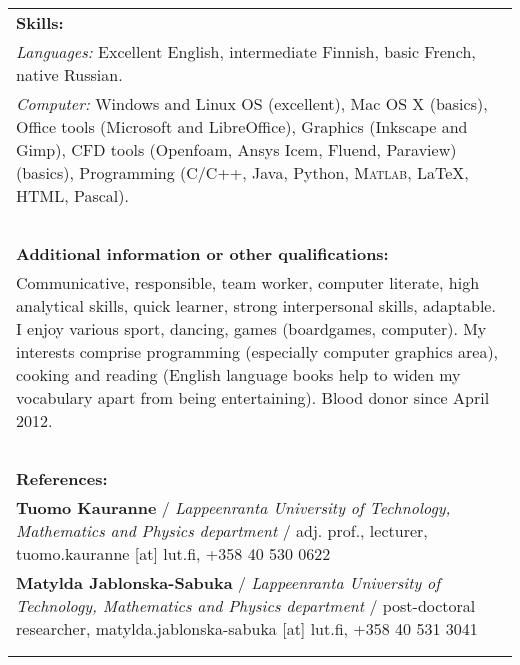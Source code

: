 \documentclass[a4paper]{article}
\begin{document}
\begin{longtable}{p{}}

\multicolumn{1}{l}{\cellcolor{myGray}\textbf{Skills:}}\\\vspace{-5pt}

\emph{Languages:} Excellent English, intermediate Finnish, basic French,
native Russian.\\

\emph{Computer:} Windows and Linux OS (excellent), Mac OS X (basics), Office
tools (Microsoft and LibreOffice), Graphics (Inkscape and Gimp), CFD tools
(Openfoam, Ansys Icem, Fluend, Paraview) (basics), Programming (C/C++, Java,
Python, \textsc{Matlab}, \LaTeX, HTML, Pascal).\\\ \\

\multicolumn{1}{l}{\cellcolor{myGray}\textbf{Additional information or other
qualifications:}}\\\vspace{-5pt}

Communicative, responsible, team worker, computer literate, high analytical
skills, quick learner, strong interpersonal skills, adaptable. I enjoy various
sport, dancing, games (boardgames, computer). My interests comprise programming
(especially computer graphics area), cooking and reading (English language
books help to widen my vocabulary apart from being entertaining). Blood donor
since April 2012.\\\ \\

\multicolumn{1}{l}{\cellcolor{myGray}\textbf{References:}}\\\vspace{-5pt}

\textbf{Tuomo Kauranne} / \textsl{Lappeenranta University of Technology,
Mathematics and Physics department} /
adj. prof., lecturer, tuomo.kauranne [at] lut.fi, +358 40 530 0622\\
\textbf{Matylda Jablonska-Sabuka} / \textsl{Lappeenranta University of
Technology, Mathematics and Physics department} / post-doctoral researcher,
matylda.jablonska-sabuka [at] lut.fi, +358 40 531 3041\\\newpage

\multicolumn{1}{l}{\cellcolor{myGray}\textbf{Publications:}}\\\vspace{-15pt}

\nocite{Mar2:2008} \nocite{Mar:2008} \nocite{InvCamCal:2011}
\nocite{DetShaArt:2014} \nocite{ShaAreCal:2015}

\vspace{-30pt}

\renewcommand{\refname}{}



\end{longtable}
\end{document}
